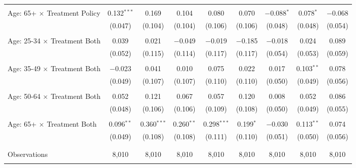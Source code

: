 \begin{tabular}{@{\extracolsep{5pt}}lcccccccc}
  & & & & & & & & \\ 
 Age: 65+ $\times$ Treatment Policy & 0.132$^{***}$ & 0.169 & 0.104 & 0.080 & 0.070 & $-$0.088$^{*}$ & 0.078$^{*}$ & $-$0.068 \\ 
  & (0.047) & (0.104) & (0.104) & (0.106) & (0.106) & (0.048) & (0.048) & (0.054) \\ 
  & & & & & & & & \\ 
 Age: 25-34 $\times$ Treatment Both & 0.039 & 0.021 & $-$0.049 & $-$0.019 & $-$0.185 & $-$0.018 & 0.024 & 0.089 \\ 
  & (0.052) & (0.115) & (0.114) & (0.117) & (0.117) & (0.054) & (0.053) & (0.059) \\ 
  & & & & & & & & \\ 
 Age: 35-49 $\times$ Treatment Both & $-$0.023 & 0.041 & 0.010 & 0.075 & 0.022 & 0.017 & 0.103$^{**}$ & 0.078 \\ 
  & (0.049) & (0.107) & (0.107) & (0.110) & (0.110) & (0.050) & (0.049) & (0.056) \\ 
  & & & & & & & & \\ 
 Age: 50-64 $\times$ Treatment Both & 0.052 & 0.121 & 0.067 & 0.057 & 0.120 & 0.008 & 0.052 & 0.086 \\ 
  & (0.048) & (0.106) & (0.106) & (0.109) & (0.108) & (0.050) & (0.049) & (0.055) \\ 
  & & & & & & & & \\ 
 Age: 65+ $\times$ Treatment Both & 0.096$^{**}$ & 0.360$^{***}$ & 0.260$^{**}$ & 0.298$^{***}$ & 0.199$^{*}$ & $-$0.030 & 0.113$^{**}$ & 0.074 \\ 
  & (0.049) & (0.108) & (0.108) & (0.111) & (0.110) & (0.051) & (0.050) & (0.056) \\ 
  & & & & & & & & \\ 
\hline \\[-1.8ex] 

Observations & 8,010 & 8,010 & 8,010 & 8,010 & 8,010 & 8,010 & 8,010 & 8,010 \\ 
\hline 
\hline \\[-1.8ex] 
\end{tabular} 